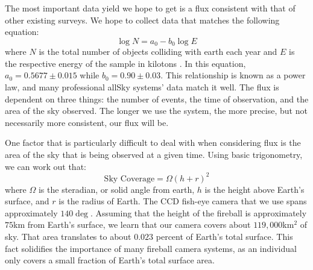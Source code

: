 The most important data yield we hope to get is a flux consistent with that of other existing surveys.
We hope to collect data that matches the following equation:
\begin{equation}
\log N = a_0 - b_0\log E
\label{eq:browneq}
\end{equation}
where $N$ is the total number of objects colliding with earth each year and $E$ is the respective energy of the sample in kilotons \cite{brown_p_flux_2002}.
In this equation, $a_0 = 0.5677 \pm 0.015$ while $b_0 = 0.90 \pm 0.03$.
This relationship is known as a power law, and many professional allSky systems' data match it well.
The flux is dependent on three things: the number of events, the time of observation, and the area of the sky observed.
The longer we use the system, the more precise, but not necessarily more consistent, our flux will be. 

One factor that is particularly difficult to deal with when considering flux is the area of the sky that is being observed at a given time.
Using basic trigonometry, we can work out that:
\begin{equation}
\text{Sky Coverage} = \Omega(h+r)^2
\label{eq:skycov}
\end{equation}
where $\Omega$ is the steradian, or solid angle from earth, $h$ is the height above Earth's surface, and $r$ is the radius of Earth. 
The CCD fish-eye camera that we use spans approximately $140\deg$.
Assuming that the height of the fireball is approximately $75$km from Earth's surface, we learn that our camera covers about $119,000$km$^2$ of sky.
That area translates to about $0.023$ percent of Earth's total surface.
This fact solidifies the importance of many fireball camera systems, as an individual only covers a small fraction of Earth's total surface area.

